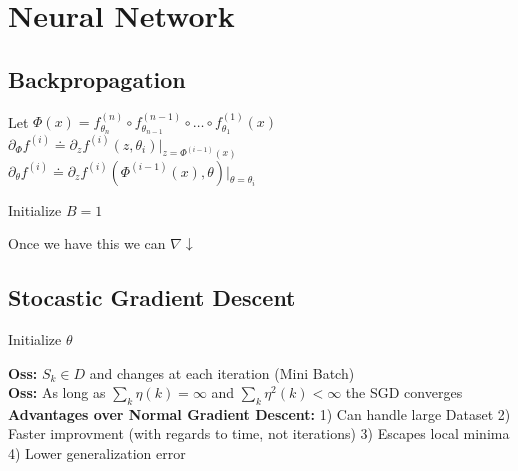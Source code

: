
\section{Neural Network}
\subsection*{Backpropagation}
Let $\Phi(x) = f^{(n)}_{\theta_n}\circ f^{(n-1)}_{\theta_{n-1}}\circ \dots \circ f^{(1)}_{\theta_{1}}(x)$\\
$\partial_{\Phi}f^{(i)}\doteq\partial_z f^{(i)}(z,\theta_i)\vert_{z=\Phi^{(i-1)}(x)}$\\
$\partial_{\theta}f^{(i)}\doteq\partial_z f^{(i)}(\Phi^{(i-1)}(x),\theta)\vert_{\theta = \theta_i}$

\begin{algorithm}[H]
    Initialize $B = 1$\;
    \end{algorithm}
Once we have this we can $\nabla \downarrow$ 
\subsection*{Stocastic Gradient Descent}
\begin{algorithm}[H]
     Initialize $\theta$\;
    \end{algorithm}
    \textbf{Oss:} $S_k \in D$ and changes at each iteration (Mini Batch)  \\
    \textbf{Oss:} As long as $\sum_k \eta(k) = \infty$ and $\sum_k \eta^2(k) <  \infty$ the SGD converges\\  
    \textbf{Advantages over Normal Gradient Descent:} 1) Can handle large Dataset 2) Faster improvment (with regards to time, not iterations) 3) Escapes local minima 4) Lower generalization error\\  